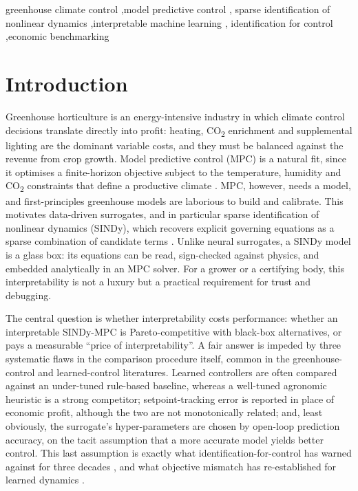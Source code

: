 \documentclass[preprint,3p]{elsarticle}
\begin{document}
\begin{frontmatter}
\begin{keyword}
greenhouse climate control \sep model predictive control \sep
sparse identification of nonlinear dynamics \sep interpretable machine learning \sep
identification for control \sep economic benchmarking
\end{keyword}

\end{frontmatter}

\section{Introduction}
\label{sec:intro}

Greenhouse horticulture is an energy-intensive industry in which climate control
decisions translate directly into profit: heating, CO\textsubscript{2} enrichment
and supplemental lighting are the dominant variable costs, and they must be balanced
against the revenue from crop growth. Model predictive control (MPC) is a natural
fit, since it optimises a finite-horizon objective subject to the temperature,
humidity and CO\textsubscript{2} constraints that define a productive climate
\citep{vanhenten1994thesis,mayne2000constrained,lin2021greenhousempc}. MPC, however,
needs a model, and first-principles greenhouse models are laborious to build and
calibrate. This motivates data-driven surrogates, and in particular sparse
identification of nonlinear dynamics (SINDy), which recovers explicit governing
equations as a sparse combination of candidate terms
\citep{brunton2016sindy,brunton2016sindyc,kaiser2018sindympc}. Unlike neural
surrogates, a SINDy model is a glass box: its equations can be read, sign-checked
against physics, and embedded analytically in an MPC solver. For a grower or a
certifying body, this interpretability is not a luxury but a practical requirement
for trust and debugging.

The central question is whether interpretability costs performance: whether an
interpretable SINDy-MPC is Pareto-competitive with black-box alternatives, or pays a
measurable ``price of interpretability''. A fair answer is impeded by three
systematic flaws in the comparison procedure itself, common in the
greenhouse-control and learned-control literatures. Learned controllers are often
compared against an under-tuned rule-based baseline, whereas a well-tuned agronomic
heuristic is a strong competitor; setpoint-tracking error is reported in place of
economic profit, although the two are not monotonically related; and, least
obviously, the surrogate's hyper-parameters are chosen by open-loop prediction
accuracy, on the tacit assumption that a more accurate model yields better control.
This last assumption is exactly what identification-for-control has warned against
for three decades \citep{gevers1993,vandenhof1995closedloop}, and what objective
mismatch has re-established for learned dynamics
\citep{lambert2020objective,jacobiandmd2022}.
\end{document}
